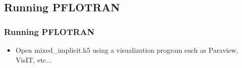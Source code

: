 \documentclass{beamer}
\begin{document}
\subsection{Running PFLOTRAN}

\begin{frame}[fragile]\frametitle{Running PFLOTRAN}


\begin{itemize}
  \item Open mixed\_implicit.h5 using a visualization program such as Paraview, VisIT, etc...
\end{itemize}

\end{frame}
\end{document}
